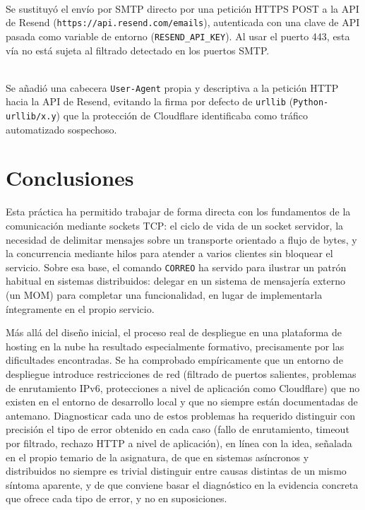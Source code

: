 \documentclass[12pt,a4paper]{article}
\begin{document}
\begin{description}[leftmargin=0cm,style=nextline]
    \item[Solución 6] \hfill \\
    Se sustituyó el envío por SMTP directo por una petición HTTPS POST a la API de Resend (\texttt{https://api.resend.com/emails}), autenticada con una clave de API pasada como variable de entorno (\texttt{RESEND\_API\_KEY}). Al usar el puerto 443, esta vía no está sujeta al filtrado detectado en los puertos SMTP.

    \item[Solución 7] \hfill \\
    Se añadió una cabecera \texttt{User-Agent} propia y descriptiva a la petición HTTP hacia la API de Resend, evitando la firma por defecto de \texttt{urllib} (\texttt{Python-urllib/x.y}) que la protección de Cloudflare identificaba como tráfico automatizado sospechoso.
\end{description}


\section{Conclusiones}

Esta práctica ha permitido trabajar de forma directa con los fundamentos de la comunicación mediante sockets TCP: el ciclo de vida de un socket servidor, la necesidad de delimitar mensajes sobre un transporte orientado a flujo de bytes, y la concurrencia mediante hilos para atender a varios clientes sin bloquear el servicio. Sobre esa base, el comando \texttt{CORREO} ha servido para ilustrar un patrón habitual en sistemas distribuidos: delegar en un sistema de mensajería externo (un MOM) para completar una funcionalidad, en lugar de implementarla íntegramente en el propio servicio.

Más allá del diseño inicial, el proceso real de despliegue en una plataforma de hosting en la nube ha resultado especialmente formativo, precisamente por las dificultades encontradas. Se ha comprobado empíricamente que un entorno de despliegue introduce restricciones de red (filtrado de puertos salientes, problemas de enrutamiento IPv6, protecciones a nivel de aplicación como Cloudflare) que no existen en el entorno de desarrollo local y que no siempre están documentadas de antemano. Diagnosticar cada uno de estos problemas ha requerido distinguir con precisión el tipo de error obtenido en cada caso (fallo de enrutamiento, timeout por filtrado, rechazo HTTP a nivel de aplicación), en línea con la idea, señalada en el propio temario de la asignatura, de que en sistemas asíncronos y distribuidos no siempre es trivial distinguir entre causas distintas de un mismo síntoma aparente, y de que conviene basar el diagnóstico en la evidencia concreta que ofrece cada tipo de error, y no en suposiciones.
\end{document}
